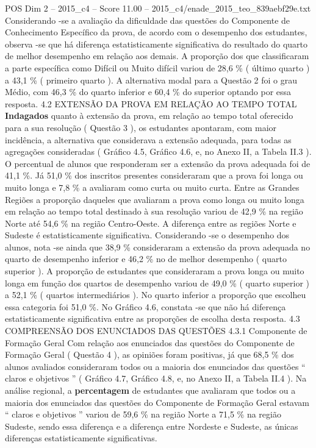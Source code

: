 \begin{textsample}{POS Dim 2 – 2015\_c4 – Score 11.00 – 2015\_c4/enade\_2015\_teo\_839aebf29e.txt}
Considerando -se a avaliação da dificuldade das questões do Componente de Conhecimento Específico da prova, de acordo com o desempenho dos estudantes, observa -se que há diferença estatisticamente significativa do resultado do quarto de melhor desempenho em relação aos demais.
A proporção dos que classificaram a parte específica como Difícil ou Muito difícil variou de 28,6 \% ( último quarto ) a 43,1 \% ( primeiro quarto ).
A alternativa modal para a Questão 2 foi o grau Médio, com 46,3 \% do quarto inferior e 60,4 \% do superior optando por essa resposta. 4.2 EXTENSÃO DA PROVA EM RELAÇÃO AO TEMPO TOTAL \textbf{Indagados} quanto à extensão da prova, em relação ao tempo total oferecido para a sua resolução ( Questão 3 ), os estudantes apontaram, com maior incidência, a alternativa que considerava a extensão adequada, para todas as agregações consideradas ( Gráfico 4.5, Gráfico 4.6, e, no Anexo II, a Tabela II.3 ).
O percentual de alunos que responderam ser a extensão da prova adequada foi de 41,1 \%.
Já 51,0 \% dos inscritos presentes consideraram que a prova foi longa ou muito longa e 7,8 \% a avaliaram como curta ou muito curta.
Entre as Grandes Regiões a proporção daqueles que avaliaram a prova como longa ou muito longa em relação ao tempo total destinado à sua resolução variou de 42,9 \% na região Norte até 54,6 \% na região Centro-Oeste.
A diferença entre as regiões Norte e Sudeste é estatisticamente significativa.
Considerando -se o desempenho dos alunos, nota -se ainda que 38,9 \% consideraram a extensão da prova adequada no quarto de desempenho inferior e 46,2 \% no de melhor desempenho ( quarto superior ).
A proporção de estudantes que consideraram a prova longa ou muito longa em função dos quartos de desempenho variou de 49,0 \% ( quarto superior ) a 52,1 \% ( quartos intermediários ).
No quarto inferior a proporção que escolheu essa categoria foi 51,0 \%.
No Gráfico 4.6, constata -se que não há diferença estatisticamente significativa entre as proporções de escolha desta resposta. 4.3 COMPREENSÃO DOS ENUNCIADOS DAS QUESTÕES 4.3.1 Componente de Formação Geral Com relação aos enunciados das questões do Componente de Formação Geral ( Questão 4 ), as opiniões foram positivas, já que 68,5 \% dos alunos avaliados consideraram todos ou a maioria dos enunciados das questões “ claros e objetivos ” ( Gráfico 4.7, Gráfico 4.8, e, no Anexo II, a Tabela II.4 ).
Na análise regional, a \textbf{percentagem} de estudantes que avaliaram que todos ou a maioria dos enunciados das questões do Componente de Formação Geral estavam “ claros e objetivos ” variou de 59,6 \% na região Norte a 71,5 \% na região Sudeste, sendo essa diferença e a diferença entre Nordeste e Sudeste, as únicas diferenças estatisticamente significativas.

\end{textsample}
